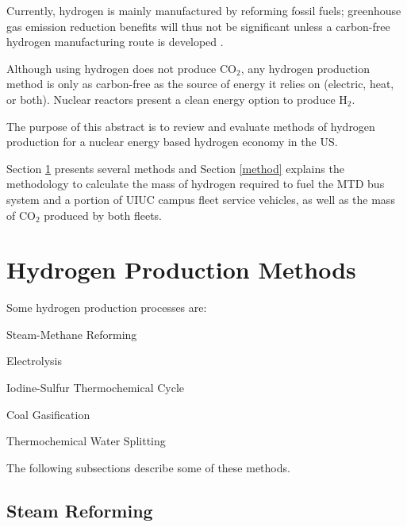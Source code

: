 \documentclass{anstrans}
\begin{document}
Currently, hydrogen is mainly manufactured by reforming fossil fuels; greenhouse gas emission
reduction benefits will thus not be significant unless a carbon-free hydrogen manufacturing route is
developed .

Although using hydrogen does not produce CO$_2$, any hydrogen production method is only as carbon-free as the source of energy it relies on (electric, heat, or both).
Nuclear reactors present a clean energy option to produce H$_2$.

The purpose of this abstract is to review and evaluate methods of hydrogen production for a nuclear energy based hydrogen economy in the \gls{US}.

Section \ref{section:hydroprod} presents several methods and Section \ref{method} explains the methodology to calculate the mass of hydrogen required to fuel the \gls{MTD} bus system and a portion of \gls{UIUC} campus fleet service vehicles, as well as the mass of CO$_2$ produced by both fleets.

\section{Hydrogen Production Methods}
\label{section:hydroprod}

Some hydrogen production processes are:
\begin{description}[font=$\bullet$\scshape\bfseries]
	\item[] Steam-Methane Reforming \cite{doe_office_of_energy_efficiency_and_renewable_energy_hydrogen_2020}
	\item[] Electrolysis \cite{doe_office_of_energy_efficiency_and_renewable_energy_hydrogen_2020}
	\item[] Iodine-Sulfur Thermochemical Cycle \cite{cea_gas-cooled_2006}
	\item[] Coal Gasification \cite{office_of_energy_efficiency_and_renewable_energy_coal_gas_2020}
	\item[] Thermochemical Water Splitting \cite{office_of_energy_efficiency_and_renewable_energy_thermo_water_2020}
\end{description}

The following subsections describe some of these methods.

\subsection{Steam Reforming}
\end{document}
